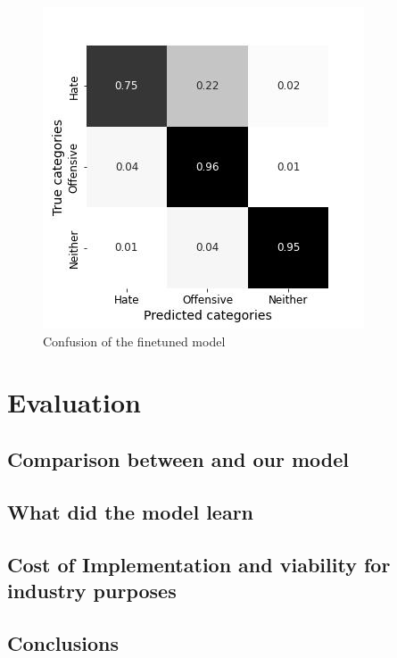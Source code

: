 \documentclass[11pt,a4paper]{article}
\begin{document}
\begin{figure}[h]
 \includegraphics[width=\linewidth]{model_confusion.jpg}
  \caption{Confusion of the finetuned model}
  \label{fig:model_confusion}
\end{figure}

\section{Evaluation}
\subsection{Comparison between \cite{auto_hatespeech} and our model}
\subsection{What did the model learn}
\subsection{Cost of Implementation and viability for industry purposes}
\subsection{Conclusions}




\end{document}
